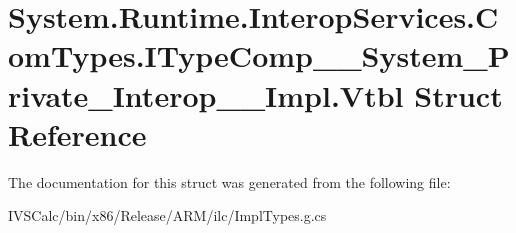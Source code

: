 \hypertarget{struct_system_1_1_runtime_1_1_interop_services_1_1_com_types_1_1_i_type_comp_____system___private___interop_____impl_1_1_vtbl}{}\section{System.\+Runtime.\+Interop\+Services.\+Com\+Types.\+I\+Type\+Comp\+\_\+\+\_\+\+System\+\_\+\+Private\+\_\+\+Interop\+\_\+\+\_\+\+Impl.\+Vtbl Struct Reference}
\label{struct_system_1_1_runtime_1_1_interop_services_1_1_com_types_1_1_i_type_comp_____system___private___interop_____impl_1_1_vtbl}


The documentation for this struct was generated from the following file\+:\begin{DoxyCompactItemize}
\item 
I\+V\+S\+Calc/bin/x86/\+Release/\+A\+R\+M/ilc/Impl\+Types.\+g.\+cs\end{DoxyCompactItemize}

